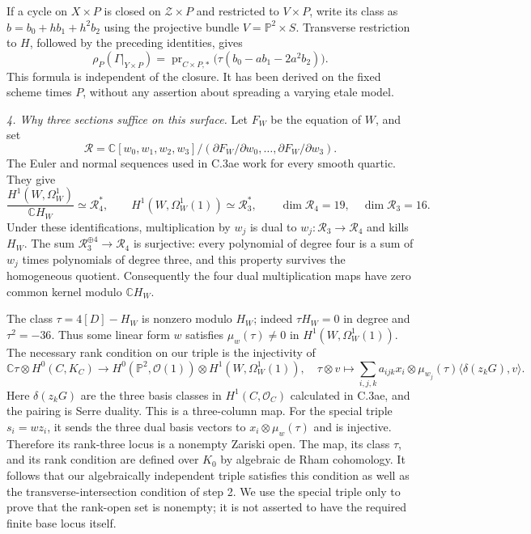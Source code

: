 If a cycle on $X\times P$ is closed on
$\mathcal Z\times P$ and restricted to $V\times P$,
write its class as $b=b_0+h b_1+h^2b_2$ using the
projective bundle $V=\mathbb P^2\times S$. Transverse
restriction to $H$, followed by the preceding identities,
gives
\[
 \rho_P(\Gamma|_{Y\times P})=
 \operatorname{pr}_{C\times P,*}
                  \bigl(\tau(b_0-a b_1-2a^2b_2)\bigr).
\]
This formula is independent of the closure. It has
been derived on the fixed scheme times $P$, without
any assertion about spreading a varying etale model.

\emph{4. Why three sections suffice on this surface.}
Let $F_W$ be the equation of $W$, and set
\[
 \mathcal R=\mathbb C[w_0,w_1,w_2,w_3]/
                 (\partial F_W/\partial w_0,\ldots,
                  \partial F_W/\partial w_3).
\]
The Euler and normal sequences used in C.3ae work
for every smooth quartic. They give
\[
 \frac{H^1(W,\Omega_W^1)}{\mathbb C H_W}
        \simeq\mathcal R_4^*,\qquad
 H^1(W,\Omega_W^1(1))\simeq\mathcal R_3^*,
 \qquad \dim\mathcal R_4=19,\quad\dim\mathcal R_3=16.
\]
Under these identifications, multiplication by $w_j$
is dual to $w_j:\mathcal R_3\to\mathcal R_4$ and kills
$H_W$. The sum
$\mathcal R_3^{\oplus4}\to\mathcal R_4$ is surjective:
every polynomial of degree four is a sum of $w_j$
times polynomials of degree three, and this property
survives the homogeneous quotient. Consequently the
four dual multiplication maps have zero common kernel
modulo $\mathbb C H_W$.

The class $\tau=4[D]-H_W$ is nonzero modulo $H_W$;
indeed $\tau H_W=0$ in degree and $\tau^2=-36$.
Thus some linear form $w$ satisfies
$\mu_w(\tau)\ne0$ in $H^1(W,\Omega_W^1(1))$.
The necessary rank condition on our triple is the
injectivity of
\[
 \mathbb C\tau\otimes H^0(C,K_C)
   \longrightarrow
 H^0(\mathbb P^2,\mathcal O(1))
                 \otimes H^1(W,\Omega_W^1(1)),
 \quad
 \tau\otimes v\longmapsto
 \sum_{i,j,k}a_{ijk}x_i\otimes\mu_{w_j}(\tau)
                           \langle\delta(z_kG),v\rangle.
\]
Here $\delta(z_kG)$ are the three basis classes in
$H^1(C,\mathcal O_C)$ calculated in C.3ae, and the
pairing is Serre duality. This is a three-column map.
For the special triple $s_i=wz_i$, it sends the three
dual basis vectors to $x_i\otimes\mu_w(\tau)$ and
is injective. Therefore its rank-three locus is a
nonempty Zariski open. The map, its class $\tau$,
and its rank condition are defined over $K_0$ by
algebraic de Rham cohomology. It follows that our
algebraically independent triple satisfies this condition
as well as the transverse-intersection condition of
step 2. We use the special triple only to prove that
the rank-open set is nonempty; it is not asserted
to have the required finite base locus itself.

